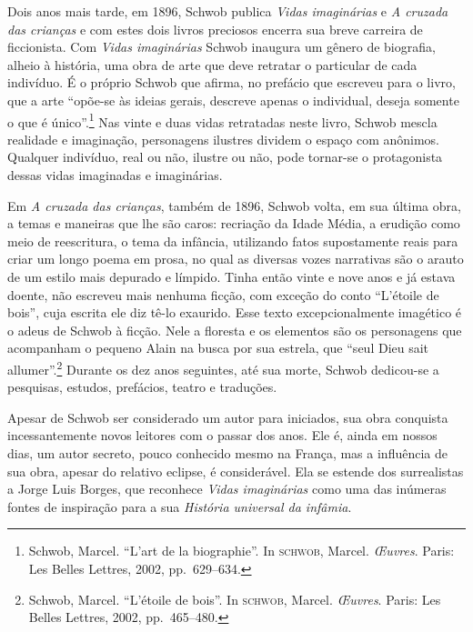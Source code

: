 Dois anos mais tarde, em 1896, Schwob publica \textit{Vidas imaginárias} e
\textit{A cruzada das crianças} e com estes dois livros preciosos
encerra sua breve carreira de ficcionista. Com \textit{Vidas imaginárias} Schwob
inaugura um gênero de biografia, alheio à história, uma obra de
arte que deve retratar o particular de cada indivíduo. É o próprio Schwob que
afirma, no prefácio que escreveu para o livro, que a arte “opõe-se às ideias
gerais, descreve apenas o individual, deseja somente o que é único”.\footnote{ Schwob, Marcel. 
``L’art de la biographie''. In \textsc{schwob}, Marcel. \textit{\OE uvres}.
Paris: Les Belles Lettres, 2002, pp.~629--634.} Nas vinte e duas vidas
retratadas neste livro, Schwob mescla realidade e imaginação, personagens
ilustres dividem o espaço com anônimos. Qualquer indivíduo, real ou não,
ilustre ou não, pode tornar-se o protagonista dessas vidas imaginadas e imaginárias.

Em \textit{A cruzada das crianças}, também de 1896,
Schwob volta, em sua última obra, a temas e maneiras que lhe são caros:
recriação da Idade Média, a erudição como meio de reescritura, o tema da
infância, utilizando fatos supostamente reais para criar um longo poema em
prosa, no qual as diversas vozes narrativas são o arauto de um estilo mais
depurado e límpido. Tinha então vinte e nove anos e já estava doente, não
escreveu mais nenhuma ficção, com exceção do conto “L'étoile de bois”, cuja
escrita ele diz tê-lo exaurido. Esse texto excepcionalmente imagético é o adeus de Schwob
à ficção. Nele a floresta e
os elementos são os personagens que acompanham o pequeno Alain na busca por sua
estrela, que “seul Dieu sait allumer”.\footnote{ Schwob, Marcel. ``L’étoile de
bois''. In \textsc{schwob}, Marcel. \textit{\OE uvres}. Paris: Les Belles Lettres, 2002, pp.~465--480.}
Durante os dez anos seguintes, até sua morte, Schwob dedicou-se a
pesquisas, estudos, prefácios, teatro e traduções.

Apesar de Schwob ser considerado um autor para iniciados, sua obra conquista
incessantemente novos leitores com o passar dos anos. Ele é, ainda em nossos
dias, um autor secreto, pouco conhecido mesmo na França, mas a influência de
sua obra, apesar do relativo eclipse, é considerável. Ela se estende
dos surrealistas a Jorge Luis Borges, que reconhece \textit{Vidas imaginárias}
como uma das inúmeras fontes de inspiração para a sua \textit{História
universal da infâmia}.

